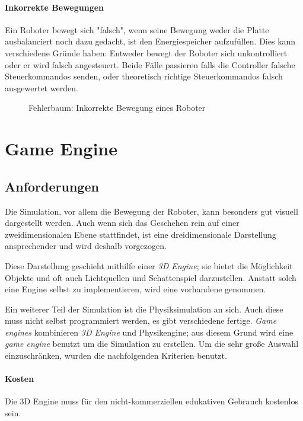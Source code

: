\paragraph{Inkorrekte Bewegungen} Ein Roboter bewegt sich "falsch", wenn seine Bewegung weder die Platte 
ausbalanciert noch dazu gedacht, ist den Energiespeicher aufzuf{\"{u}}llen. Dies kann verschiedene Gr{\"{u}}nde 
haben: Entweder bewegt der Roboter sich unkontrolliert oder er wird falsch angesteuert. Beide F{\"{a}}lle
passieren falls die Controller falsche Steuerkommandos senden, oder theoretisch richtige Steuerkommandos
falsch ausgewertet werden.
\begin{figure}
	\centering
	\caption{Fehlerbaum: Inkorrekte Bewegung eines Roboter}
	\label{fig:fault-tree-robot2}
\end{figure}

\clearpage
\section{Game Engine}
\subsection{Anforderungen}
Die Simulation, vor allem die Bewegung der Roboter, kann besonders gut visuell dargestellt werden.
Auch wenn sich das Geschehen rein auf einer zweidimensionalen Ebene stattfindet, ist eine dreidimensionale
Darstellung ansprechender und wird deshalb vorgezogen.

Diese Darstellung geschieht mithilfe einer \textit{3D Engine}; sie bietet die M{\"{o}}glichkeit Objekte und oft 
auch Lichtquellen und Schattenspiel darzustellen. Anstatt solch eine Engine selbst zu implementieren, wird eine 
vorhandene genommen.

Ein weiterer Teil der Simulation ist die Physiksimulation an sich. Auch diese muss nicht selbst programmiert
werden, es gibt verschiedene fertige. \textit{Game engines} kombinieren \textit{3D Engine} und Physikengine;
aus diesem Grund wird eine \textit{game engine} benutzt um die Simulation zu erstellen. Um die sehr gro{\ss}e 
Auswahl einzuschr{\"{a}}nken, wurden die nachfolgenden Kriterien benutzt.

\paragraph{Kosten} Die 3D Engine muss f{\"{u}}r den nicht-kommerziellen edukativen Gebrauch kostenlos sein.

